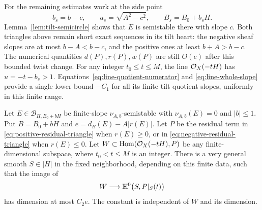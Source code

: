 For the remaining estimates work at the side point
\[
 b_s=b-c,\qquad a_s=\sqrt{A^2-c^2},\qquad B_s=B_0+b_sH.
\]
Lemma~\ref{lem:tilt-semicircle} shows that $E$ is semistable there
with slope $c$.
Both triangles above remain short exact sequences in its tilt
heart: the negative sheaf slopes are at most $b-A<b-c$, and the
positive ones at least $b+A>b-c$.  The numerical quantities
$d(P),r(P),w(P)$ are still $O(e)$ after this bounded twist change.
For any integer $t_0\leq t\leq M$, the line $\mathcal O_X(-tH)$ has
$u=-t-b_s>1$.  Equations~\eqref{eq:line-quotient-numerator} and
\eqref{eq:line-whole-slope} provide a single lower bound $-C_1$ for
all its finite tilt quotient slopes, uniformly in this finite range.

\begin{lemma}\label{lem:restriction-image}
Let $E\in\mathcal B_{H,B_0+bH}$ be finite-slope
$\nu_{A,b}$-semistable with $\nu_{A,b}(E)=0$ and $|b|\leq1$.
Put $B=B_0+bH$ and $e=d_B(E)-A|r(E)|$.  Let $P$ be the residual term in
\eqref{eq:positive-residual-triangle} when $r(E)\geq0$, or in
\eqref{eq:negative-residual-triangle} when $r(E)\leq0$.
Let
$W\subset\operatorname{Hom}(\mathcal O_X(-tH),P)$ be any finite-dimensional subspace,
where $t_0<t\leq M$ is an integer.  There is a very general smooth
$S\in|H|$ in the fixed neighborhood, depending on this finite data,
such that the image of
\[
 W\longrightarrow\mathbb H^0\bigl(S,P|_S(t)\bigr)
\]
has dimension at most $C_2e$.  The constant is independent of $W$
and its dimension.
\end{lemma}

